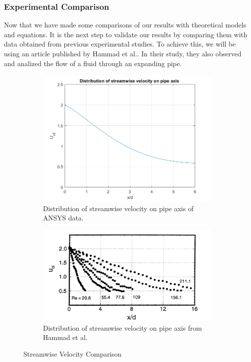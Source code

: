 \subsubsection{Experimental Comparison}
Now that we have made some comparisons of our results with theoretical models and equations. It is the next step to validate our results by comparing them with data obtained from previous experimental studies. To achieve this, we will be using an article published by Hammad et al.\cite{hammad_ötügen_arik_1999}. In their study, they also observed and analized the flow of a fluid through an expanding pipe.

\begin{figure}[H]
 \centering
\begin{subfigure}{.7\textwidth}
  \centering
  \includegraphics[width=.7\linewidth]{images/task1/x_d_norm.png}
  \caption{Distribution of streamwise velocity on pipe axis of ANSYS data.}
  \label{fig:x_d_norm}
\end{subfigure}%

\begin{subfigure}{.8\textwidth}
  \centering
  \includegraphics[width=.9\linewidth]{images/task1/x_d_norm_actual.png}
  \caption{Distribution of streamwise velocity on pipe axis from Hammad et al.\cite{hammad_ötügen_arik_1999}}
  \label{fig:x_d_norm_actual}
\end{subfigure}

\caption{Streamwise Velocity Comparison}
\label{fig:xd_norm}
\end{figure}

